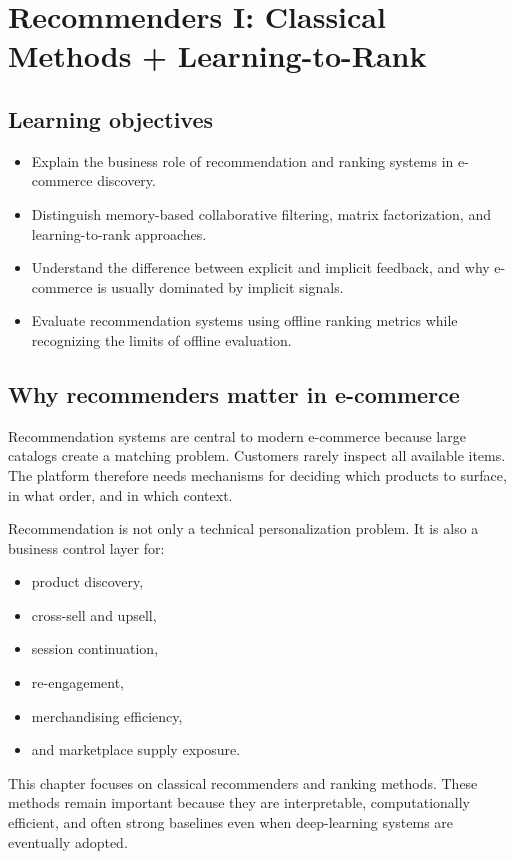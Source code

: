 \chapter[Recommenders I: Classical Methods]{Recommenders I: Classical Methods + Learning-to-Rank}

\section{Learning objectives}
\begin{itemize}
  \item Explain the business role of recommendation and ranking systems in e-commerce discovery.
  \item Distinguish memory-based collaborative filtering, matrix factorization, and learning-to-rank approaches.
  \item Understand the difference between explicit and implicit feedback, and why e-commerce is usually dominated by implicit signals.
  \item Evaluate recommendation systems using offline ranking metrics while recognizing the limits of offline evaluation.
\end{itemize}

\section{Why recommenders matter in e-commerce}
Recommendation systems are central to modern e-commerce because large catalogs create a matching problem.
Customers rarely inspect all available items.
The platform therefore needs mechanisms for deciding which products to surface, in what order, and in which context.

Recommendation is not only a technical personalization problem.
It is also a business control layer for:
\begin{itemize}
  \item product discovery,
  \item cross-sell and upsell,
  \item session continuation,
  \item re-engagement,
  \item merchandising efficiency,
  \item and marketplace supply exposure.
\end{itemize}

This chapter focuses on classical recommenders and ranking methods.
These methods remain important because they are interpretable, computationally efficient, and often strong baselines even when deep-learning systems are eventually adopted.

